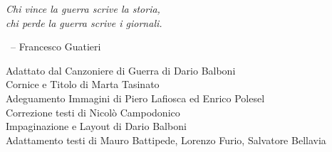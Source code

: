 \begin{myquote}\it
  Chi vince la guerra scrive la storia,\\
  chi perde la guerra scrive i giornali.
  
  {~\hfill\normalfont -- Francesco Guatieri}
\end{myquote}

\vfill

\begin{adjustwidth}{\sectionnumlen}{}\fontsize{10}{15}\selectfont
  Adattato dal Canzoniere di Guerra di Dario Balboni\\

  Cornice e Titolo di Marta Tasinato\\
  Adeguamento Immagini di Piero Lafiosca ed Enrico Polesel\\
  Correzione testi di Nicolò Campodonico\\
  Impaginazione e Layout di Dario Balboni\\

  Adattamento testi di Mauro Battipede, Lorenzo Furio, Salvatore Bellavia\\
\end{adjustwidth}
\clearpage

